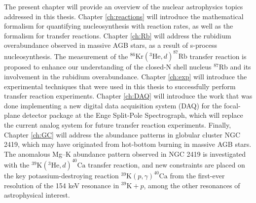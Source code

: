 The present chapter will provide an overview of the nuclear astrophysics topics addressed in this thesis. Chapter \ref{ch:reactions} will introduce the mathematical formalism for quantifying nucleosynthesis with reaction rates, as well as the formalism for transfer reactions. Chapter \ref{ch:Rb} will address the rubidium overabundance observed in massive AGB stars, as a result of s-process nucleosynthesis. The measurement of the $^{86}\mathrm{Kr}(^{3}\mathrm{He},d)^{87}\mathrm{Rb}$ transfer reaction is proposed to enhance our understanding of the closed-N shell nucleus $^{87}$Rb and its involvement in the rubidium overabundance. Chapter \ref{ch:exp} will introduce the experimental techniques that were used in this thesis to successfully perform transfer reaction experiments. Chapter \ref{ch:DAQ} will introduce the work that was done implementing a new digital data acquisition system (DAQ) for the focal-plane detector package at the Enge Split-Pole Spectrograph, which will replace the current analog system for future transfer reaction experiments. Finally, Chapter \ref{ch:GC} will address the abundance patterns in globular cluster NGC 2419, which may have originated from hot-bottom burning in massive AGB stars. The anomalous Mg--K abundance pattern observed in NGC 2419 is investigated with the $^{39}\mathrm{K}(^{3}\mathrm{He},d)^{40}\mathrm{Ca}$ transfer reaction, and new constraints are placed on the key potassium-destroying reaction $^{39}\mathrm{K}(p,\gamma)^{40}\mathrm{Ca}$ from the first-ever resolution of the 154 keV resonance in $^{39}\mathrm{K}+p$, among the other resonances of astrophysical interest.

